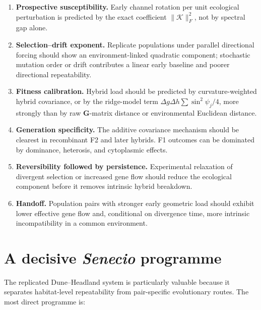 \documentclass[11pt,a4paper]{article}
\newcommand{\G}{\mathbf G}
\newcommand{\cK}{\mathcal K}
\begin{document}
\begin{enumerate}[leftmargin=1.6em]
\item \textbf{Prospective susceptibility.} Early channel rotation per unit ecological perturbation is predicted by the exact coefficient \(\lVert\cK\rVert_F^2\), not by spectral gap alone.
\item \textbf{Selection--drift exponent.} Replicate populations under parallel directional forcing should show an environment-linked quadratic component; stochastic mutation order or drift contributes a linear early baseline and poorer directional repeatability.
\item \textbf{Fitness calibration.} Hybrid load should be predicted by curvature-weighted hybrid covariance, or by the ridge-model term \(\Delta g\Delta h\sum\sin^2\psi_j/4\), more strongly than by raw \(\G\)-matrix distance or environmental Euclidean distance.
\item \textbf{Generation specificity.} The additive covariance mechanism should be clearest in recombinant F2 and later hybrids. F1 outcomes can be dominated by dominance, heterosis, and cytoplasmic effects.
\item \textbf{Reversibility followed by persistence.} Experimental relaxation of divergent selection or increased gene flow should reduce the ecological component before it removes intrinsic hybrid breakdown.
\item \textbf{Handoff.} Population pairs with stronger early geometric load should exhibit lower effective gene flow and, conditional on divergence time, more intrinsic incompatibility in a common environment.
\end{enumerate}

\section{A decisive \textit{Senecio} programme}

The replicated Dune--Headland system is particularly valuable because it separates habitat-level repeatability from pair-specific evolutionary routes. The most direct programme is:
\end{document}
